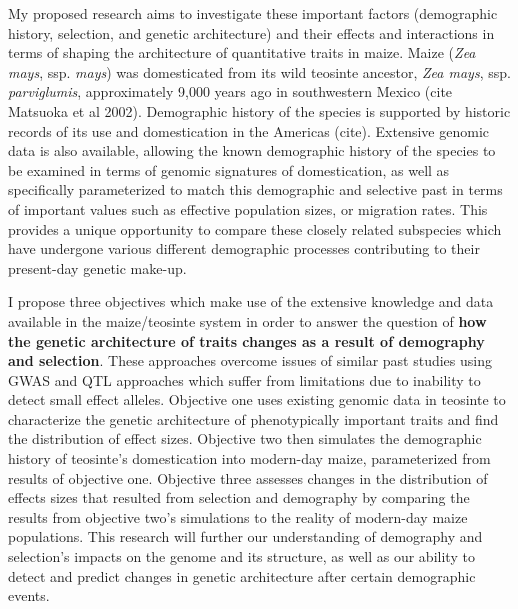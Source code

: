 My proposed research aims to investigate these important factors (demographic history, selection, and genetic architecture) and their effects and interactions in terms of shaping the architecture of quantitative traits in maize.  Maize (\emph{Zea mays}, ssp. \emph{mays}) was domesticated from its wild teosinte ancestor, \emph{Zea mays}, ssp. \emph{parviglumis}, approximately 9,000 years ago in southwestern Mexico (cite Matsuoka et al 2002). 
Demographic history of the species is supported by historic records of its use and domestication in the Americas (cite). Extensive genomic data is also available, allowing the known demographic history of the species to be examined in terms of genomic signatures of domestication, as well as specifically parameterized to match this demographic and selective past in terms of important values such as effective population sizes, or migration rates. This provides a unique opportunity to compare these closely related subspecies which have undergone various different demographic processes contributing to their present-day genetic make-up.

I propose three objectives which make use of the extensive knowledge and data available in the maize\//teosinte system in order to answer the question of \textbf{how the genetic architecture of traits changes as a result of demography and selection}. These approaches overcome issues of similar past studies using GWAS and QTL approaches which suffer from limitations due to inability to detect small effect alleles. Objective one uses existing genomic data in teosinte to characterize the genetic architecture of phenotypically important traits and find the distribution of effect sizes. Objective two then simulates the demographic history of teosinte's domestication into modern-day maize, parameterized from results of objective one. Objective three assesses changes in the distribution of effects sizes that resulted from selection and demography by comparing the results from objective two's simulations to the reality of modern-day maize populations. This research will further our understanding of demography and selection's impacts on the genome and its structure, as well as our ability to detect and predict changes in genetic architecture after certain demographic events.



	



